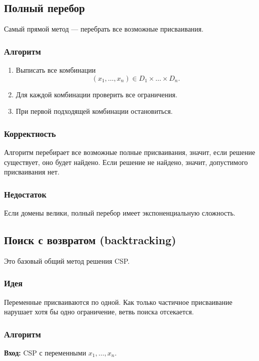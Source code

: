 \documentclass[12pt,a4paper]{article}
\theoremstyle{definition}
\theoremstyle{plain}
\begin{document}
\subsection{Полный перебор}
Самый прямой метод --- перебрать все возможные присваивания.

\subsubsection{Алгоритм}
\begin{enumerate}
\item Выписать все комбинации
\[
(x_1,\dots,x_n)\in D_1\times\dots\times D_n.
\]
\item Для каждой комбинации проверить все ограничения.
\item При первой подходящей комбинации остановиться.
\end{enumerate}

\subsubsection{Корректность}
Алгоритм перебирает все возможные полные присваивания, значит, если решение существует, оно будет найдено. Если решение не найдено, значит, допустимого присваивания нет.

\subsubsection{Недостаток}
Если домены велики, полный перебор имеет экспоненциальную сложность.

\subsection{Поиск с возвратом (backtracking)}
Это базовый общий метод решения CSP.

\subsubsection{Идея}
Переменные присваиваются по одной. Как только частичное присваивание нарушает хотя бы одно ограничение, ветвь поиска отсекается.

\subsubsection{Алгоритм}
\textbf{Вход:} CSP с переменными $x_1,\dots,x_n$.
\end{document}
